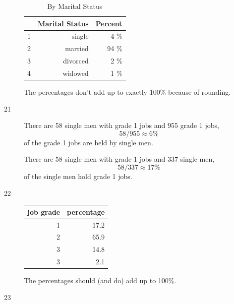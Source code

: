 \documentclass[letterpaper, landscape]{exam}
\begin{document}
\begin{description}
        \begin{table}[H]
          \centering
          \begin{tabular}{rrr}
            \toprule
              & Marital Status & Percent \\
            \midrule
            1 & single         & 4 \% \\
            2 & married        & 94 \% \\
            3 & divorced       & 2 \% \\
            4 & widowed        & 1 \% \\
            \bottomrule
          \end{tabular}
          \caption{By Marital Status}
        \end{table}

      The percentages don't add up to exactly 100\% because of rounding.
      
    \item[21]
      There are 58 single men with grade 1 jobs and 955 grade 1 jobs, 
      \[
        58/955 \approx 6 \%
      \]
      of the grade 1 jobs are held by single men.

      There are 58 single men with grade 1 jobs and 337 single men, 
      \[
        58/337 \approx 17 \% 
      \]
      of the single men hold grade 1 jobs.

    \item[22]
      \begin{table}[H]
        \centering
        \begin{tabular}{rr}
          \toprule
          job grade & percentage \\
          \midrule
          1         & 17.2  \\
          2         & 65.9  \\
          3         & 14.8  \\
          3         & 2.1   \\
          \bottomrule
        \end{tabular}
      \end{table}

      The percentages should (and do) add up to 100\%.

    \item[23]
\end{description}
\end{document}
